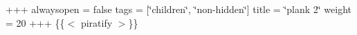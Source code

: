 +++ alwaysopen = false tags = \mbox{[}\char`\"{}children\char`\"{}, \char`\"{}non-\/hidden\char`\"{}\mbox{]} title = \char`\"{}plank 2\char`\"{} weight = 20 +++ \{\{$<$ piratify $>$\}\} 